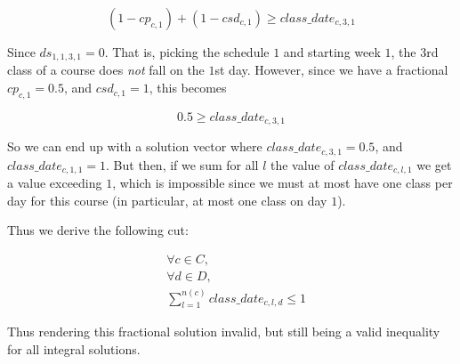 $$
(1 - cp_{c, 1}) + (1 - csd_{c, 1}) \ge class\_date_{c, 3, 1}
$$

Since $ds_{1, 1, 3, 1} = 0$. That is, picking the schedule $1$ and starting week $1$, the $3$rd class of a course does \emph{not} fall on the $1$st day. However, since we have a fractional $cp_{c, 1} = 0.5$, and $csd_{c, 1} = 1$, this becomes

$$
0.5 \ge class\_date_{c, 3, 1}
$$

So we can end up with a solution vector where $class\_date_{c, 3, 1} = 0.5$, and $class\_date_{c, 1, 1} = 1$. But then, if we sum for all $l$ the value of $class\_date_{c, l, 1}$ we get a value exceeding $1$, which is impossible since we must at most have one class per day for this course (in particular, at most one class on day $1$).

Thus we derive the following cut:

\begin{align}
&\forall c \in C,\\
&\forall d \in D,\\
&\sum_{l = 1}^{n(c)} class\_date_{c, l, d} \le 1
\end{align}

Thus rendering this fractional solution invalid, but still being a valid inequality for all integral solutions.
